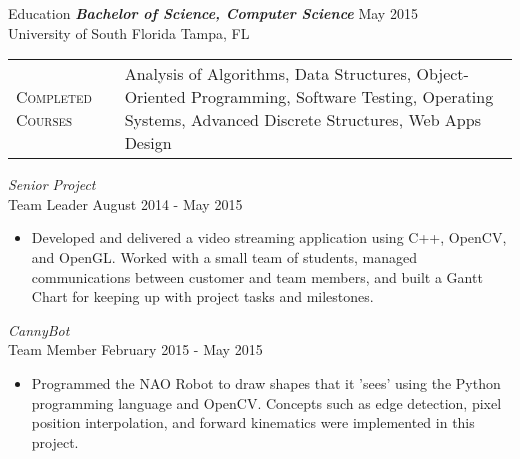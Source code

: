 \begin{section}{Education}
  {\sl \textbf{Bachelor of Science, Computer Science}} \hfill May 2015 \\
  University of South Florida \hfill Tampa, FL \\
  \begin{tabularx}{\linewidth}{@{}l X@{}}
    \textsc{Completed Courses} &\small{Analysis of Algorithms, Data Structures, Object-Oriented Programming, Software Testing, Operating Systems, Advanced Discrete Structures, Web Apps Design}\\
  \end{tabularx}
  {\sl Senior Project} \\ Team Leader \hfill August 2014 - May 2015
  \begin{itemize}
    \item Developed and delivered a video streaming application using C++, OpenCV, and OpenGL. Worked with a small team of students, managed communications between customer and team members, and built a Gantt Chart for keeping up with project tasks and milestones.
  \end{itemize}
  {\sl CannyBot} \\ Team Member \hfill February 2015 - May 2015
  \begin{itemize}
    \item Programmed the NAO Robot to draw shapes that it 'sees' using the Python programming language and OpenCV. Concepts such as edge detection, pixel position interpolation, and forward kinematics were implemented in this project.
  \end{itemize}
\end{section}
